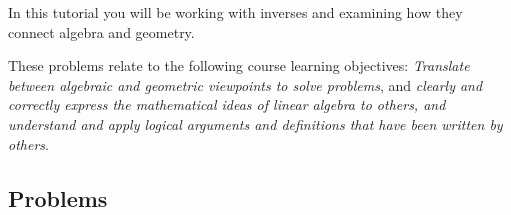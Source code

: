 		\begin{objectives}
	In this tutorial you will be working with inverses and examining how they connect algebra
			and geometry.

	These problems relate to the following course learning objectives:
			\textit{Translate between algebraic and geometric viewpoints to solve problems}, and
	\textit{clearly and correctly express the mathematical ideas of linear algebra to others,
	and understand and apply logical arguments and definitions that have been written by others}.
		\end{objectives}


\subsection*{Problems}

